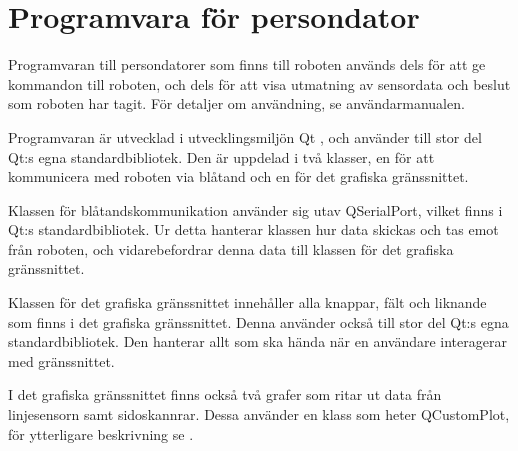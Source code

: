 \section{Programvara för persondator}
Programvaran till persondatorer som finns till roboten används dels för att ge kommandon till roboten, och dels för att visa utmatning av sensordata och beslut som roboten har tagit. För detaljer om användning, se användarmanualen.

Programvaran är utvecklad i utvecklingsmiljön Qt \cite{qt}, och använder till stor del Qt:s egna standardbibliotek. Den är uppdelad i två klasser, en för att kommunicera med roboten via blåtand och en för det grafiska gränssnittet.

Klassen för blåtandskommunikation använder sig utav QSerialPort, vilket finns i Qt:s standardbibliotek. Ur detta hanterar klassen hur data skickas och tas emot från roboten, och vidarebefordrar denna data till klassen för det grafiska gränssnittet.

Klassen för det grafiska gränssnittet innehåller alla knappar, fält och liknande som finns i det grafiska gränssnittet. Denna använder också till stor del Qt:s egna standardbibliotek. Den hanterar allt som ska hända när en användare interagerar med gränssnittet.

I det grafiska gränssnittet finns också två grafer som ritar ut data från linjesensorn samt sidoskannrar. Dessa använder en klass som heter QCustomPlot, för ytterligare beskrivning se \cite{qcustomplot}.  
